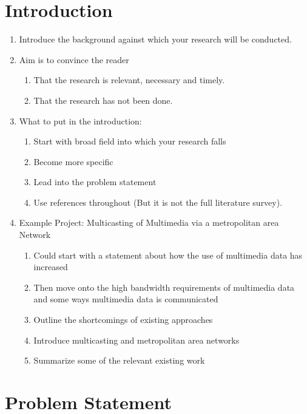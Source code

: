\documentclass[runningheads,a4paper]{llncs}
\begin{document}
\section{Introduction}

\begin{enumerate}
  \item Introduce the background against which your research will be conducted.
  \item Aim is to convince the reader
  \begin{enumerate}
   \item That the research is relevant, necessary and timely.
   \item That the research has not been done.
  \end{enumerate}
  \item What to put in the introduction:
  \begin{enumerate}
   \item Start with broad field into which your research falls
   \item Become more specific
   \item Lead into the problem statement
   \item Use references throughout (But it is not the full literature survey).
  \end{enumerate}
  \item Example Project: Multicasting of Multimedia via a metropolitan area Network
  \begin{enumerate}
   \item Could start with a statement about how the use of multimedia data has increased
   \item Then move onto the high bandwidth requirements of multimedia data and some ways multimedia data is communicated
   \item Outline the shortcomings of existing approaches
   \item Introduce multicasting and metropolitan area networks
   \item Summarize some of the relevant existing work
  \end{enumerate}
\end{enumerate}


\section{Problem Statement}
\end{document}
